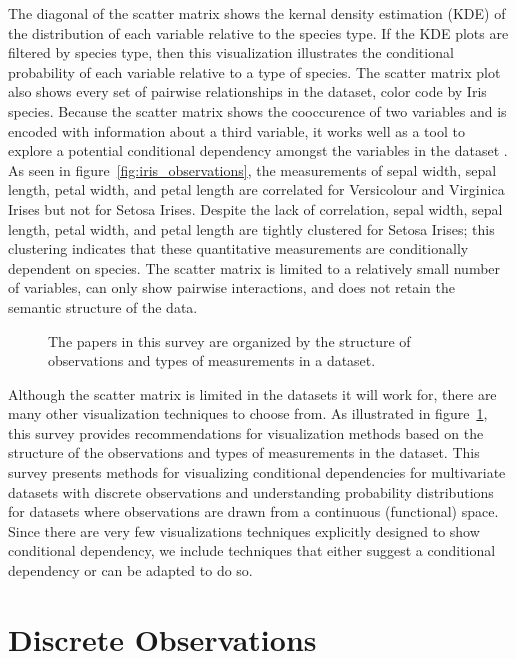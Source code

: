 \documentclass[letterpaper,onecolumn,titlepage]{Ythesis}
\begin{document}
The diagonal of the scatter matrix shows the kernal density estimation (KDE) \cite{scott_multivariate_1992, chambers_graphical_1983, stigler_mathematical_1978} of the distribution of each variable relative to the species type. If the KDE plots are filtered by species type, then this visualization illustrates the conditional probability of each variable relative to a type of species. The scatter matrix plot also shows every set of pairwise relationships in the dataset, color code by Iris species. Because the scatter matrix shows the cooccurence of two variables and is encoded with information about a third variable, it works well as a tool to explore a potential conditional dependency amongst the variables in the dataset \cite{dawid_conditional_1979}. As seen in figure~\ref{fig:iris_observations}, the  measurements of sepal width, sepal length, petal width, and petal length are correlated for Versicolour and Virginica Irises but not for Setosa Irises. Despite the lack of correlation, sepal width, sepal length, petal width, and petal length are tightly clustered for Setosa Irises; this clustering indicates that these quantitative measurements are conditionally dependent on species. The scatter matrix is limited to a relatively small number of variables, can only show pairwise interactions, and does not retain the semantic structure of the data.   


\begin{figure}[H]
\center

\caption{The papers in this survey are organized by the structure of observations and types of measurements in a dataset.}
\label{fig:papermap}
\end{figure}

Although the scatter matrix is limited in the datasets it will work for, there are many other visualization techniques to choose from. As illustrated in figure~\ref{fig:papermap}, this survey provides recommendations for visualization methods based on the structure of the observations and types of measurements in the dataset. This survey presents methods for visualizing conditional dependencies for multivariate datasets with discrete observations and understanding probability distributions for datasets where observations are drawn from a continuous (functional) space. Since there are very few visualizations techniques explicitly designed to show conditional dependency, we include techniques that either suggest a conditional dependency or can be adapted to do so. 

\section{Discrete Observations}



\end{document}
